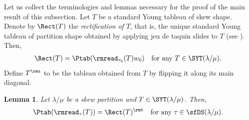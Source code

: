 \documentclass[12pt, reqno]{amsart}
\newtheorem{lemma}[theorem]{Lemma}
\theoremstyle{definition}
\numberwithin{equation}{section} \numberwithin{figure}{section}
\numberwithin{table}{section}
\begin{document}
Let us collect the terminologies and lemmas necessary for the proof of the main result of this subsection.
Let $T$ be a standard Young tableau of skew shape.
Denote by $\Rect(T)$ the \emph{rectification of $T$}, that is, the unique standard Young tableau of partition shape obtained by applying jeu de taquin slides to $T$ (see \cite[Section 1.2]{97Ful}).
Then, 
\begin{align}\label{eq: Ptab read and Rect}
\Rect(T) = 
\Ptab(\rmread_{\tau_0}(T) w_0) 
\quad \text{for any $T \in \SYT(\lambda/\mu)$.}
\end{align}
Define $T^\rmt$ to be the tableau obtained from $T$ by flipping it along its main diagonal.






\begin{lemma}\label{lem: admissible same Q}
Let $\lambda / \mu$ be a skew partition and $T \in \SYT(\lambda/\mu)$.
Then, 
\[
\Ptab(\rmread_\tau(T)) = \Rect(T)^\rmt
\quad
\text{for any $\tau \in \sfDS(\lambda/\mu)$.}
\]
\end{lemma}
\end{document}
